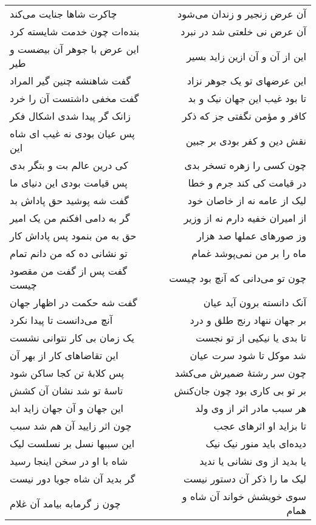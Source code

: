 \begin{center}
\begin{longtable}{l p{0.5cm} r}
چاکرت شاها جنایت می‌کند
&&
آن عرض زنجیر و زندان می‌شود
\\
بنده‌ات چون خدمت شایسته کرد
&&
آن عرض نی خلعتی شد در نبرد
\\
این عرض با جوهر آن بیضست و طیر
&&
این از آن و آن ازین زاید بسیر
\\
گفت شاهنشه چنین گیر المراد
&&
این عرضهای تو یک جوهر نزاد
\\
گفت مخفی داشتست آن را خرد
&&
تا بود غیب این جهان نیک و بد
\\
زانک گر پیدا شدی اشکال فکر
&&
کافر و مؤمن نگفتی جز که ذکر
\\
پس عیان بودی نه غیب ای شاه این
&&
نقش دین و کفر بودی بر جبین
\\
کی درین عالم بت و بتگر بدی
&&
چون کسی را زهره تسخر بدی
\\
پس قیامت بودی این دنیای ما
&&
در قیامت کی کند جرم و خطا
\\
گفت شه پوشید حق پاداش بد
&&
لیک از عامه نه از خاصان خود
\\
گر به دامی افکنم من یک امیر
&&
از امیران خفیه دارم نه از وزیر
\\
حق به من بنمود پس پاداش کار
&&
وز صورهای عملها صد هزار
\\
تو نشانی ده که من دانم تمام
&&
ماه را بر من نمی‌پوشد غمام
\\
گفت پس از گفت من مقصود چیست
&&
چون تو می‌دانی که آنچ بود چیست
\\
گفت شه حکمت در اظهار جهان
&&
آنک دانسته برون آید عیان
\\
آنچ می‌دانست تا پیدا نکرد
&&
بر جهان ننهاد رنج طلق و درد
\\
یک زمان بی کار نتوانی نشست
&&
تا بدی یا نیکیی از تو نجست
\\
این تقاضاهای کار از بهر آن
&&
شد موکل تا شود سرت عیان
\\
پس کلابهٔ تن کجا ساکن شود
&&
چون سر رشتهٔ ضمیرش می‌کشد
\\
تاسهٔ تو شد نشان آن کشش
&&
بر تو بی کاری بود چون جان‌کنش
\\
این جهان و آن جهان زاید ابد
&&
هر سبب مادر اثر از وی ولد
\\
چون اثر زایید آن هم شد سبب
&&
تا بزاید او اثرهای عجب
\\
این سببها نسل بر نسلست لیک
&&
دیده‌ای باید منور نیک نیک
\\
شاه با او در سخن اینجا رسید
&&
یا بدید از وی نشانی یا ندید
\\
گر بدید آن شاه جویا دور نیست
&&
لیک ما را ذکر آن دستور نیست
\\
چون ز گرمابه بیامد آن غلام
&&
سوی خویشش خواند آن شاه و همام
\\

\end{longtable}
\end{center}
